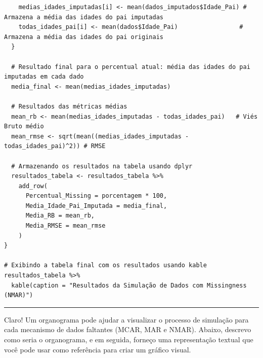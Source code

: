 \documentclass[11pt]{article}
\begin{document}
\begin{verbatim}
    medias_idades_imputadas[i] <- mean(dados_imputados$Idade_Pai) # Armazena a média das idades do pai imputadas
    todas_idades_pai[i] <- mean(dados$Idade_Pai)                 # Armazena a média das idades do pai originais
  }
  
  # Resultado final para o percentual atual: média das idades do pai imputadas em cada dado
  media_final <- mean(medias_idades_imputadas)
  
  # Resultados das métricas médias
  mean_rb <- mean(medias_idades_imputadas - todas_idades_pai)   # Viés Bruto médio
  mean_rmse <- sqrt(mean((medias_idades_imputadas - todas_idades_pai)^2)) # RMSE

  # Armazenando os resultados na tabela usando dplyr
  resultados_tabela <- resultados_tabela %>%
    add_row(
      Percentual_Missing = porcentagem * 100,
      Media_Idade_Pai_Imputada = media_final,
      Media_RB = mean_rb,
      Media_RMSE = mean_rmse
    )
}

# Exibindo a tabela final com os resultados usando kable
resultados_tabela %>%
  kable(caption = "Resultados da Simulação de Dados com Missingness (NMAR)")

\end{verbatim}

\noindent\rule{\textwidth}{0.5pt}
Claro! Um organograma pode ajudar a visualizar o processo de simulação para cada mecanismo de dados faltantes (MCAR, MAR e NMAR). Abaixo, descrevo como seria o organograma, e em seguida, forneço uma representação textual que você pode usar como referência para criar um gráfico visual.
\end{document}
